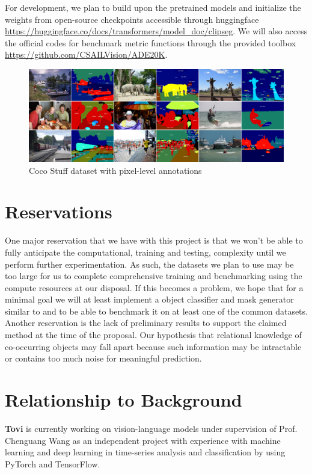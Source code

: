\documentclass[10pt,twocolumn,letterpaper]{article}
\begin{document}
For development, we plan to build upon the pretrained models and initialize the weights from open-source checkpoints accessible through huggingface \url{https://huggingface.co/docs/transformers/model_doc/clipseg}. We will also access the official codes for benchmark metric functions through the provided toolbox \url{https://github.com/CSAILVision/ADE20K}.

\begin{figure}[h]
    \centering
    \includegraphics[width=0.9\linewidth]{cocostuff.png}
    \caption{Coco Stuff \cite{cocostuff} dataset with pixel-level annotations}
    \label{fig:enter-label}
\end{figure}

\section{Reservations}

One major reservation that we have with this project is that we won’t be able to fully anticipate the computational, training and testing, complexity until we perform further experimentation. As such, the datasets we plan to use may be too large for us to complete comprehensive training and benchmarking using the compute resources at our disposal. If this becomes a problem, we hope that for a minimal goal we will at least implement a object classifier and mask generator similar to \cite{simseg} and to be able to benchmark it on at least one of the common datasets. Another reservation is the lack of preliminary results to support the claimed method at the time of the proposal. Our hypothesis that relational knowledge of co-occurring objects may fall apart because such information may be intractable or contains too much noise for meaningful prediction.



\section{Relationship to Background}

\textbf{Tovi} is currently working on vision-language models under supervision of Prof. Chenguang Wang as an independent project with experience with machine learning and deep learning in time-series analysis and classification by using PyTorch and TensorFlow.
\end{document}
